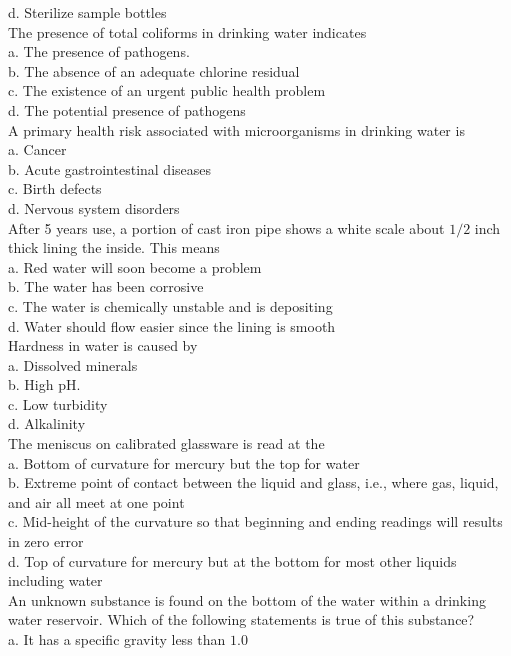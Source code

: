 d. Sterilize sample bottles\\
  The presence of total coliforms in drinking water indicates\\
a. The presence of pathogens.\\
b. The absence of an adequate chlorine residual\\
c. The existence of an urgent public health problem\\
d. The potential presence of pathogens\\
A primary health risk associated with microorganisms in drinking water is\\
a. Cancer\\
b. Acute gastrointestinal diseases\\
c. Birth defects\\
d. Nervous system disorders\\
  After 5 years use, a portion of cast iron pipe shows a white scale about $1 / 2$ inch thick lining the inside. This means\\
a. Red water will soon become a problem\\
b. The water has been corrosive\\
c. The water is chemically unstable and is depositing\\
d. Water should flow easier since the lining is smooth\\
  Hardness in water is caused by\\
a. Dissolved minerals\\
b. High $\mathrm{pH}$.\\
c. Low turbidity\\
d. Alkalinity\\
  The meniscus on calibrated glassware is read at the\\
a. Bottom of curvature for mercury but the top for water\\
b. Extreme point of contact between the liquid and glass, i.e., where gas, liquid, and air all meet at one point\\
c. Mid-height of the curvature so that beginning and ending readings will results in zero error\\
d. Top of curvature for mercury but at the bottom for most other liquids including water\\
  An unknown substance is found on the bottom of the water within a drinking water reservoir. Which of the following statements is true of this substance?\\
a. It has a specific gravity less than $1.0$\\

